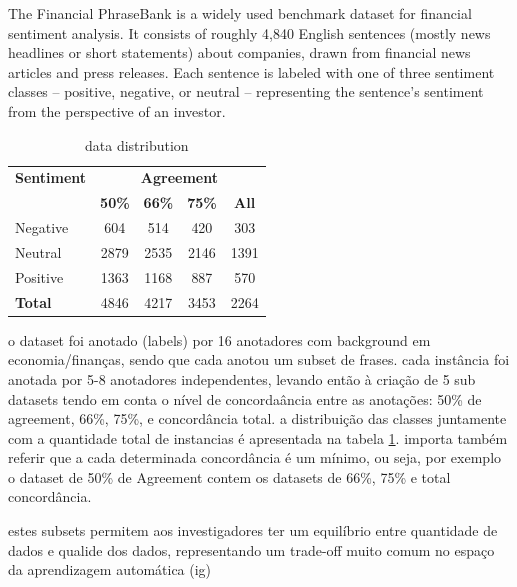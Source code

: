 \documentclass[conference]{IEEEtran}
\begin{document}
The Financial PhraseBank is a widely used benchmark dataset for financial sentiment analysis. It consists of roughly 4,840 English sentences (mostly news headlines or short statements) about companies, drawn from financial news articles and press releases. Each sentence is labeled with one of three sentiment classes – positive, negative, or neutral – representing the sentence’s sentiment from the perspective of an investor.

\begin{table}[H]
\centering
\caption{data distribution}
\label{agreement_datasets}
\begin{tabular}{lcccc}
\toprule
\textbf{Sentiment} & \multicolumn{4}{c}{\textbf{Agreement}} \\
\cmidrule(lr){2-5}
 & \textbf{50\%} & \textbf{66\%} & \textbf{75\%} & \textbf{All} \\
\midrule
Negative & 604 & 514 & 420 & 303 \\
Neutral & 2879 & 2535 & 2146 & 1391 \\
Positive & 1363 & 1168 & 887 & 570 \\
\midrule
\textbf{Total} & 4846 & 4217 & 3453 & 2264 \\
\bottomrule
\end{tabular}
\end{table}

o dataset foi anotado (labels) por 16 anotadores com background em economia/finanças, sendo que cada anotou um subset de frases. cada instância foi anotada por 5-8 anotadores independentes, levando então à criação de 5 sub datasets tendo em conta o nível de concordaância entre as anotações: 50\% de agreement, 66\%, 75\%, e concordância total. a distribuição das classes juntamente com a quantidade total de instancias é apresentada na tabela \ref{agreement_datasets}. importa também referir que a cada determinada concordância é um mínimo, ou seja, por exemplo o dataset de 50\% de Agreement contem os datasets de 66\%, 75\% e total concordância.

estes subsets permitem aos investigadores ter um equilíbrio entre quantidade de dados e qualide dos dados, representando um trade-off muito comum no espaço da aprendizagem automática (ig)



\end{document}

